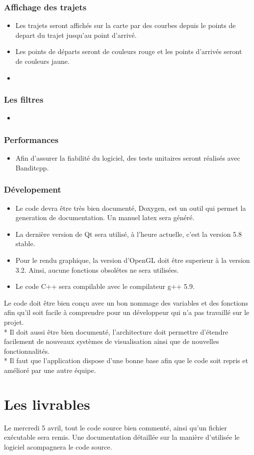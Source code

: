 \documentclass[12pt]{article}
\begin{document}
			\subsubsection{Affichage des trajets}
				\begin{itemize}
					\item Les trajets seront affichés sur la carte par des courbes depuis le points de depart du trajet jusqu'au point d'arrivé.
					\item Les points de départs seront de couleurs rouge et les points d'arrivés seront de couleurs jaune.
					\item 
				\end{itemize}

			\subsubsection{Les filtres}
				\begin{itemize}
					\item 
				\end{itemize}

			\subsubsection{Performances}
				\begin{itemize}
					\item Afin d'assurer la fiabilité du logiciel, des tests unitaires seront réalisés avec Banditcpp. 
				\end{itemize}

			\subsubsection{Dévelopement}
				\begin{itemize}
					\item Le code devra être très bien documenté, Doxygen, est un outil qui permet la generation de documentation. Un manuel latex sera généré.
					\item La dernière version de Qt sera utilisé, à l'heure actuelle, c'est la version 5.8 stable.
					\item Pour le rendu graphique, la version d'OpenGL doit être superieur à la version 3.2. Ainsi, aucune fonctions obsolétes ne sera utilisées.
					\item Le code C++ sera compilable avec le compilateur g++ 5.9.
				\end{itemize}

			Le code doit être bien conçu avec un bon nommage des variables et des fonctions afin qu'il soit facile à comprendre pour un développeur qui n'a pas travaillé sur le projet.\\*
			Il doit aussi être bien documenté, l'architecture doit permettre d'étendre facilement de nouveaux systèmes de visualisation ainsi que de nouvelles fonctionnalités.\\*
			Il faut que l'application dispose d'une bonne base afin que le code soit repris et amélioré par une autre équipe.
	\newpage

	\section{Les livrables}
		Le mercredi 5 avril, tout le code source bien commenté, ainsi qu'un fichier exécutable sera remis. Une documentation détaillée sur la manière d'utilisée le logiciel acompagnera le code source.
	\newpage

	
\end{document}
